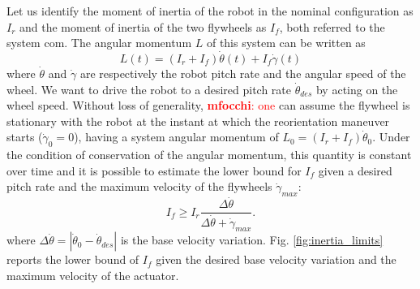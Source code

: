 \documentclass[sensors,article,submit,pdftex,moreauthors]{Definitions/mdpi}
\newcommand{\MF}[1]{\textcolor{red}{\textbf{mfocchi}: #1}}
\begin{document}
Let us identify the moment of inertia of the robot in the nominal configuration as $I_r$ and the moment of inertia of the two flywheels as $I_f$, both referred to the system \gls{com}.
The angular momentum $L$ of this system can be written as
\begin{equation}\label{eq:ang_mom_elroy}
L(t) = \left(I_r + I_{f}\right)\dot{\theta}(t) + I_{f}\dot{\gamma}(t)
\end{equation}
where $\dot{\theta}$ and $\dot{\gamma}$ are respectively the robot pitch rate and the angular speed of the wheel.
We want to drive the robot to a desired pitch rate $\dot{\theta}_{des}$ by acting on the wheel speed.
Without loss of generality, \MF{one} can assume the flywheel is stationary with the robot at the instant at which the reorientation maneuver starts ($\dot{\gamma}_0 = 0$), having a system angular momentum of $L_0 = \left(I_r + I_{f}\right)\dot{\theta}_0$.
Under the condition of conservation of the angular momentum, this quantity is constant over time and it is possible to estimate the lower bound for $I_{f}$ given a desired pitch rate and the maximum velocity of the flywheels $\dot{\gamma}_{max}$:
\begin{equation}
I_{f} \geq I_r \dfrac{ \Delta \dot{\theta} }{\Delta \dot{\theta}+\dot{\gamma}_{max}}.
\end{equation}
where $\Delta \dot{\theta} =  \left\lvert \dot{\theta}_0-\dot{\theta}_{des} \right\rvert$ is the base velocity variation.
Fig. \ref{fig:inertia_limits} reports the lower bound of $I_{f}$ given the desired base velocity variation and the maximum velocity of the actuator.
\end{document}
